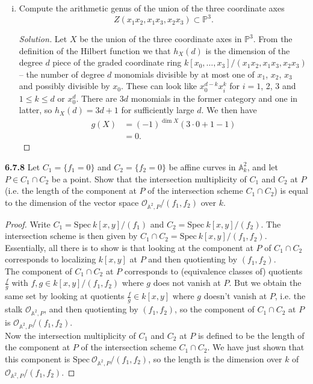 \documentclass[11pt,letterpaper]{report}
\newcommand{\mcal}[1]{\mathcal{#1}}
\newcommand{\affine}{\mathbb{A}}
\newcommand{\projective}{\mathbb{P}}
\newcommand{\Spec}{\text{Spec}}
\newenvironment{solution}
{\begin{proof}[Solution]}
{\end{proof}}
\begin{document}
\begin{enumerate}[(i)]
\begin{proof}
		\noindent If $C$ is a plane curve in $\projective^2$ then we simply substitute $n=2$ into the above formula to obtain $g(C) = \frac{1}{2}(d-1)(d-2)$ as desired.
	\end{proof}
	\item Compute the arithmetic genus of the union of the three coordinate axes
	\[
	Z(x_1x_2, x_1x_3, x_2x_3)\subset \projective^3.
	\]
	\begin{solution}
		Let $X$ be the union of the three coordinate axes in $\projective^3$. From the definition of the Hilbert function we that $h_X(d)$ is the dimension of the degree $d$ piece of the graded coordinate ring $k[x_0, \ldots, x_3]/(x_1x_2, x_1x_3, x_2x_3)$ -- the number of degree $d$ monomials divisible by at most one of $x_1$, $x_2$, $x_3$ and possibly divisible by $x_0$. These can look like $x_0^{d-k}x_i^k$ for $i=1$, 2, 3 and $1\leq k\leq d$ or $x_0^d$. There are $3d$ monomials in the former category and one in latter, so $h_X(d) = 3d+1$ for sufficiently large $d$. We then have
		\begin{align*}
		g(X) &= (-1)^{\dim X}(3\cdot 0+1-1)\\
		&= 0.
		\end{align*}
	\end{solution}
\end{enumerate}

\noindent\textbf{6.7.8}
Let $C_1 = \{f_1=0\}$ and $C_2 = \{f_2 = 0\}$ be affine curves in $\affine_k^2$, and let $P\in C_1\cap C_2$ be a point. Show that the intersection multiplicity of $C_1$ and $C_2$ at $P$ (i.e. the length of the component at $P$ of the intersection scheme $C_1\cap C_2$) is equal to the dimension of the vector space $\mcal{O}_{\affine^2, P}/(f_1, f_2)$ over $k$.
\begin{proof}
	Write $C_1 = \Spec\ k[x,y]/(f_1)$ and $C_2 = \Spec\ k[x,y]/(f_2)$. The intersection scheme is then given by $C_1\cap C_2 = \Spec\ k[x,y]/(f_1, f_2)$. Essentially, all there is to show is that looking at the component at $P$ of $C_1\cap C_2$ corresponds to localizing $k[x,y]$ at $P$ and then quotienting by $(f_1, f_2)$.\\

	\noindent The component of $C_1\cap C_2$ at $P$ corresponds to (equivalence classes of) quotients $\frac{f}{g}$ with $f,g\in k[x,y]/(f_1, f_2)$ where $g$ does not vanish at $P$. But we obtain the same set by looking at quotients $\frac{f}{g}\in k[x,y]$ where $g$ doesn't vanish at $P$, i.e. the stalk $\mcal{O}_{\affine^2, P}$, and then quotienting by $(f_1, f_2)$, so the component of $C_1\cap C_2$ at $P$ is $\mcal{O}_{\affine^2, P}/(f_1, f_2)$.\\

	\noindent Now the intersection multiplicity of $C_1$ and $C_2$ at $P$ is defined to be the length of the component at $P$ of the intersection scheme $C_1\cap C_2$. We have just shown that this component is $\Spec\ \mcal{O}_{\affine^2, P}/(f_1, f_2)$, so the length is the dimension over $k$ of $\mcal{O}_{\affine^2, P}/(f_1, f_2)$.
\end{proof}
\end{document}
